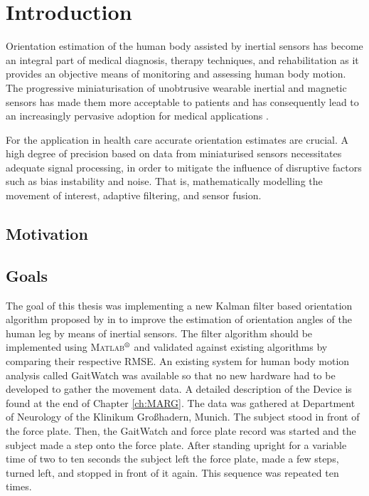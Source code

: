 \chapter{Introduction}
\label{ch:Introduction}

Orientation estimation of the human body assisted by inertial sensors has become an integral part of medical diagnosis, therapy techniques, and rehabilitation as it provides an objective means of monitoring and assessing human body motion. The progressive miniaturisation of unobtrusive wearable inertial and magnetic sensors has made them more acceptable to patients and has consequently lead to an increasingly pervasive adoption for medical applications \cite{wee_soon_ambulatory_2008}.

For the application in health care accurate orientation estimates are crucial. A high degree of precision based on data from miniaturised sensors necessitates adequate signal processing, in order to mitigate the influence of disruptive factors such as bias instability and noise. That is, mathematically modelling the movement of interest, adaptive filtering, and sensor fusion.

\section{Motivation}


\section{Goals}

The goal of this thesis was implementing a new Kalman filter based orientation algorithm proposed by \citeauthor{bennett_motion_2014} in \cite{bennett_motion_2014} to improve the estimation of orientation angles of the human leg by means of inertial sensors. The filter algorithm should be implemented using \textsc{Matlab}$\textsuperscript{\textregistered}$ and validated against existing algorithms by comparing their respective \gls{RMSE}. An existing system for human body motion analysis called GaitWatch was available so that no new hardware had to be developed to gather the movement data. A detailed description of the Device is found at the end of Chapter \ref{ch:MARG}. The data was gathered at Department of Neurology of the Klinikum Großhadern, Munich. The subject stood in front of the force plate. Then, the GaitWatch and force plate record was started and the subject made a step onto the force plate. After standing upright for a variable time of two to ten seconds the subject left the force plate, made a few steps, turned left, and stopped in front of it again. This sequence was repeated ten times.


